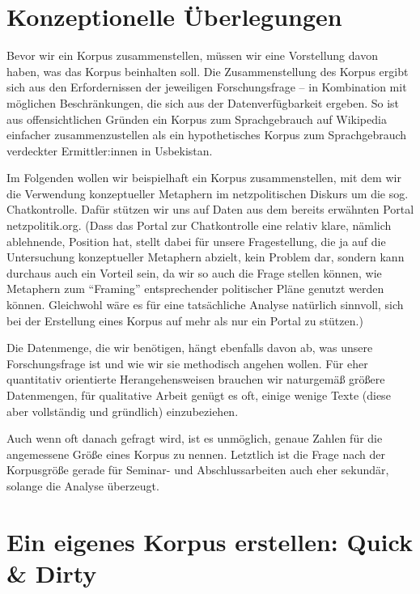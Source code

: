 \documentclass[
  letterpaper,
  DIV=11,
  numbers=noendperiod]{scrreprt}
\begin{document}

\chapter{Konzeptionelle
Überlegungen}\label{konzeptionelle-uxfcberlegungen}

Bevor wir ein Korpus zusammenstellen, müssen wir eine Vorstellung davon
haben, was das Korpus beinhalten soll. Die Zusammenstellung des Korpus
ergibt sich aus den Erfordernissen der jeweiligen Forschungsfrage -- in
Kombination mit möglichen Beschränkungen, die sich aus der
Datenverfügbarkeit ergeben. So ist aus offensichtlichen Gründen ein
Korpus zum Sprachgebrauch auf Wikipedia einfacher zusammenzustellen als
ein hypothetisches Korpus zum Sprachgebrauch verdeckter Ermittler:innen
in Usbekistan.

Im Folgenden wollen wir beispielhaft ein Korpus zusammenstellen, mit dem
wir die Verwendung konzeptueller Metaphern im netzpolitischen Diskurs um
die sog. Chatkontrolle. Dafür stützen wir uns auf Daten aus dem bereits
erwähnten Portal netzpolitik.org. (Dass das Portal zur Chatkontrolle
eine relativ klare, nämlich ablehnende, Position hat, stellt dabei für
unsere Fragestellung, die ja auf die Untersuchung konzeptueller
Metaphern abzielt, kein Problem dar, sondern kann durchaus auch ein
Vorteil sein, da wir so auch die Frage stellen können, wie Metaphern zum
``Framing'' entsprechender politischer Pläne genutzt werden können.
Gleichwohl wäre es für eine tatsächliche Analyse natürlich sinnvoll,
sich bei der Erstellung eines Korpus auf mehr als nur ein Portal zu
stützen.)

Die Datenmenge, die wir benötigen, hängt ebenfalls davon ab, was unsere
Forschungsfrage ist und wie wir sie methodisch angehen wollen. Für eher
quantitativ orientierte Herangehensweisen brauchen wir naturgemäß
größere Datenmengen, für qualitative Arbeit genügt es oft, einige wenige
Texte (diese aber vollständig und gründlich) einzubeziehen.

Auch wenn oft danach gefragt wird, ist es unmöglich, genaue Zahlen für
die angemessene Größe eines Korpus zu nennen. Letztlich ist die Frage
nach der Korpusgröße gerade für Seminar- und Abschlussarbeiten auch eher
sekundär, solange die Analyse überzeugt.


\chapter{Ein eigenes Korpus erstellen: Quick \&
Dirty}\label{ein-eigenes-korpus-erstellen-quick-dirty}
\end{document}
